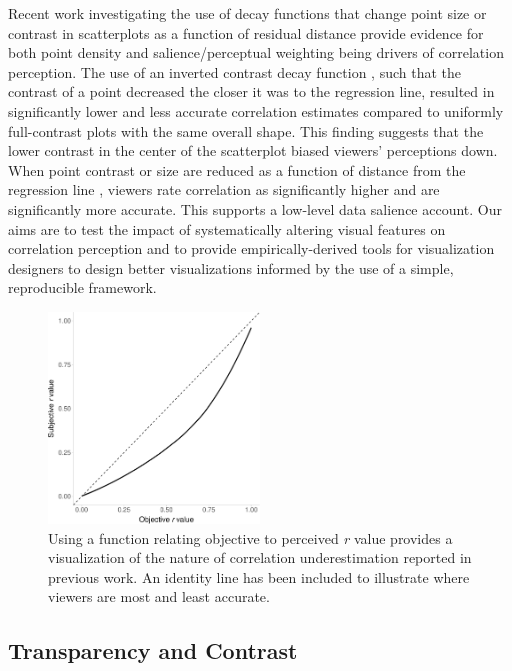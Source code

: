 \documentclass[manuscript, review, anonymous, screen]{acmart}
\begin{document}
Recent work investigating the use of decay functions that change point
size or contrast in scatterplots as a function of residual distance
provide evidence for both point density and salience/perceptual
weighting being drivers of correlation perception. The use of an
inverted contrast decay function \citep{strain_2023}, such that the
contrast of a point decreased the closer it was to the regression line,
resulted in significantly lower and less accurate correlation estimates
compared to uniformly full-contrast plots with the same overall shape.
This finding suggests that the lower contrast in the center of the
scatterplot biased viewers' perceptions down. When point contrast or
size are reduced as a function of distance from the regression line
\citep{strain_2023, strain_2023b}, viewers rate correlation as
significantly higher and are significantly more accurate. This supports
a low-level data salience account. Our aims are to test the impact of
systematically altering visual features on correlation perception and to
provide empirically-derived tools for visualization designers to design
better visualizations informed by the use of a simple, reproducible
framework.

\begin{figure}

\includegraphics[width=0.5\textwidth,height=\textheight]{size_and_opacity_files/figure-pdf/fig-underestimation-curve-1.pdf} \hfill{}

\caption{\label{fig-underestimation-curve}Using a function relating
objective to perceived \emph{r} value \citep{rensink_2017} provides a
visualization of the nature of correlation underestimation reported in
previous work. An identity line has been included to illustrate where
viewers are most and least accurate.}

\end{figure}

\hypertarget{sec-transparency-and-contrast}{%
\subsection{Transparency and
Contrast}\label{sec-transparency-and-contrast}}
\end{document}
